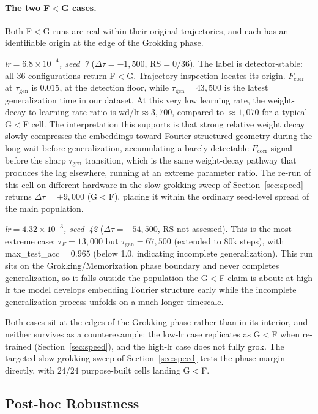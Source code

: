 \documentclass{article}
\newcommand{\taug}{\tau_{\mathrm{gen}}}
\newcommand{\tauf}{\tau_{F}}
\newcommand{\Dtau}{\Delta\tau}
\newcommand{\fcorr}{F_{\mathrm{corr}}}
\begin{document}
\paragraph{The two F$<$G cases.}
Both F$<$G runs are real within their original trajectories, and
each has an identifiable origin at the edge of the Grokking phase.

\textit{lr$=6.8\!\times\!10^{-4}$, seed~7} ($\Dtau=-1{,}500$,
RS$=0/36$).
The label is detector-stable: all 36 configurations return F$<$G.
Trajectory inspection locates its origin. $\fcorr$ at $\taug$ is
$0.015$, at the detection floor, while $\taug=43{,}500$
is the latest generalization time in our dataset.
At this very low learning rate, the weight-decay-to-learning-rate
ratio is $\mathrm{wd}/\mathrm{lr}\approx3{,}700$, compared to
$\approx1{,}070$ for a typical G$<$F cell.
The interpretation this supports is that strong relative weight
decay slowly compresses the embeddings toward Fourier-structured
geometry during the long wait before generalization, accumulating
a barely detectable $\fcorr$ signal before the sharp $\taug$
transition, which is the same weight-decay pathway that produces
the lag elsewhere, running at an extreme parameter ratio.
The re-run of this cell on different hardware in the
slow-grokking sweep of Section~\ref{sec:speed} returns
$\Dtau{=}{+}9{,}000$ (G$<$F), placing it within the ordinary
seed-level spread of the main population.

\textit{lr$=4.32\!\times\!10^{-3}$, seed~42} ($\Dtau=-54{,}500$,
RS not assessed).
This is the most extreme case: $\tauf=13{,}000$ but
$\taug=67{,}500$ (extended to 80k steps), with
max\_test\_acc$=0.965$ (below 1.0, indicating incomplete
generalization).
This run sits on the Grokking/Memorization phase boundary and
never completes generalization, so it falls outside the population
the G$<$F claim is about: at high lr the model develops embedding
Fourier structure early while the incomplete generalization
process unfolds on a much longer timescale.

Both cases sit at the edges of the Grokking phase rather than in
its interior, and neither survives as a counterexample: the low-lr
case replicates as G$<$F when re-trained
(Section~\ref{sec:speed}), and the high-lr case does not fully
grok. The targeted slow-grokking sweep of
Section~\ref{sec:speed} tests the phase margin directly, with
$24/24$ purpose-built cells landing G$<$F.

\subsection{Post-hoc Robustness}
\label{sec:posthoc}
\end{document}
